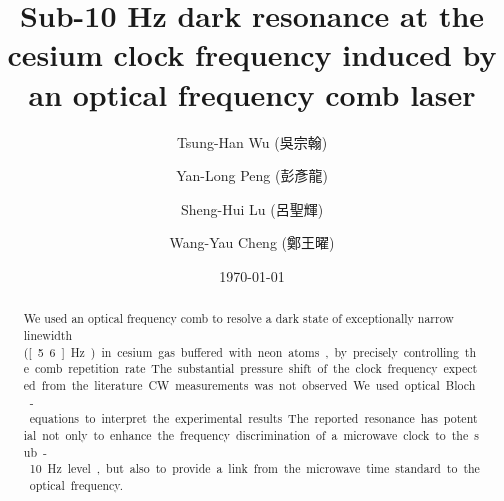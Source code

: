 \documentclass[%
aps,
prl,
showpacs,
twocolumn,
]{revtex4}
\begin{document}
\begin{CJK*}{UTF8}{}

\title{Sub-10 Hz dark resonance at the cesium clock frequency induced by an optical frequency comb laser}


\author{Tsung-Han Wu (吳宗翰)}
\author{Yan-Long Peng (彭彥龍)}
\author{Sheng-Hui Lu (呂聖輝)}
\author{Wang-Yau Cheng (鄭王曜)}


\date{\today}

\begin{abstract}
We used an optical frequency comb to resolve a dark state of
exceptionally narrow linewidth (\unit[5.6]{Hz}) in cesium gas buffered
with neon atoms, by precisely controlling the comb repetition rate.
The substantial pressure shift of the clock frequency expected
from the literature CW measurements was not observed. We
used optical Bloch-equations to interpret the experimental results. The
reported resonance has potential not only to enhance the
frequency discrimination of a microwave clock to the sub-10~Hz level,
but also to provide a link from the microwave time standard to the
optical frequency.
\end{abstract}


\maketitle
\end{CJK*}
\end{document}
